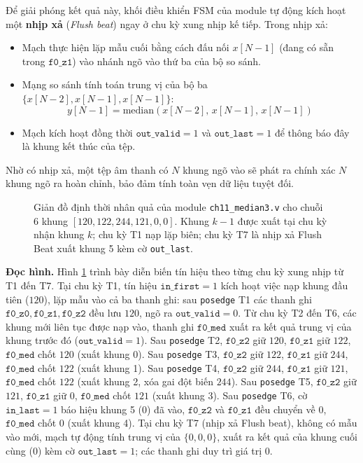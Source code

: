 Để giải phóng kết quả này, khối điều khiển FSM của module tự động kích hoạt một \textbf{nhịp xả} (\emph{Flush beat}) ngay ở chu kỳ xung nhịp kế tiếp. Trong nhịp xả:
\begin{itemize}
    \item Mạch thực hiện lặp mẫu cuối bằng cách đấu nối $x[N-1]$ (đang có sẵn trong $\texttt{f0\_z1}$) vào nhánh ngõ vào thứ ba của bộ so sánh.
    \item Mạng so sánh tính toán trung vị của bộ ba $\{x[N-2], x[N-1], x[N-1]\}$:
    \begin{equation}
        y[N-1] = \text{median}(x[N-2],\, x[N-1],\, x[N-1])
    \end{equation}
    \item Mạch kích hoạt đồng thời $\texttt{out\_valid} = 1$ và $\texttt{out\_last} = 1$ để thông báo đây là khung kết thúc của tệp.
\end{itemize}
Nhờ có nhịp xả, một tệp âm thanh có $N$ khung ngõ vào sẽ phát ra chính xác $N$ khung ngõ ra hoàn chỉnh, bảo đảm tính toàn vẹn dữ liệu tuyệt đối.

\begin{figure}[htbp]
    \centering
    
    \caption{Giản đồ định thời nhân quả của module \texttt{ch11\_median3.v} cho chuỗi 6 khung $[120, 122, 244, 121, 0, 0]$. Khung $k-1$ được xuất tại chu kỳ nhận khung $k$; chu kỳ T1 nạp lặp biên; chu kỳ T7 là nhịp xả Flush Beat xuất khung 5 kèm cờ \texttt{out\_last}.}
    \label{fig:ch11_median_timing}
\end{figure}

\textbf{Đọc hình.} Hình \ref{fig:ch11_median_timing} trình bày diễn biến tín hiệu theo từng chu kỳ xung nhịp từ T1 đến T7. Tại chu kỳ T1, tín hiệu $\texttt{in\_first}=1$ kích hoạt việc nạp khung đầu tiên ($120$), lặp mẫu vào cả ba thanh ghi: sau \texttt{posedge} T1 các thanh ghi $\texttt{f0\_z0}, \texttt{f0\_z1}, \texttt{f0\_z2}$ đều lưu $120$, ngõ ra $\texttt{out\_valid}=0$. Từ chu kỳ T2 đến T6, các khung mới liên tục được nạp vào, thanh ghi $\texttt{f0\_med}$ xuất ra kết quả trung vị của khung trước đó ($\texttt{out\_valid}=1$). Sau \texttt{posedge} T2, $\texttt{f0\_z2}$ giữ $120$, $\texttt{f0\_z1}$ giữ $122$, $\texttt{f0\_med}$ chốt $120$ (xuất khung 0). Sau \texttt{posedge} T3, $\texttt{f0\_z2}$ giữ $122$, $\texttt{f0\_z1}$ giữ $244$, $\texttt{f0\_med}$ chốt $122$ (xuất khung 1). Sau \texttt{posedge} T4, $\texttt{f0\_z2}$ giữ $244$, $\texttt{f0\_z1}$ giữ $121$, $\texttt{f0\_med}$ chốt $122$ (xuất khung 2, xóa gai đột biến $244$). Sau \texttt{posedge} T5, $\texttt{f0\_z2}$ giữ $121$, $\texttt{f0\_z1}$ giữ $0$, $\texttt{f0\_med}$ chốt $121$ (xuất khung 3). Sau \texttt{posedge} T6, cờ $\texttt{in\_last}=1$ báo hiệu khung 5 ($0$) đã vào, $\texttt{f0\_z2}$ và $\texttt{f0\_z1}$ đều chuyển về $0$, $\texttt{f0\_med}$ chốt $0$ (xuất khung 4). Tại chu kỳ T7 (nhịp xả Flush beat), không có mẫu vào mới, mạch tự động tính trung vị của $\{0, 0, 0\}$, xuất ra kết quả của khung cuối cùng ($0$) kèm cờ $\texttt{out\_last}=1$; các thanh ghi duy trì giá trị $0$.

